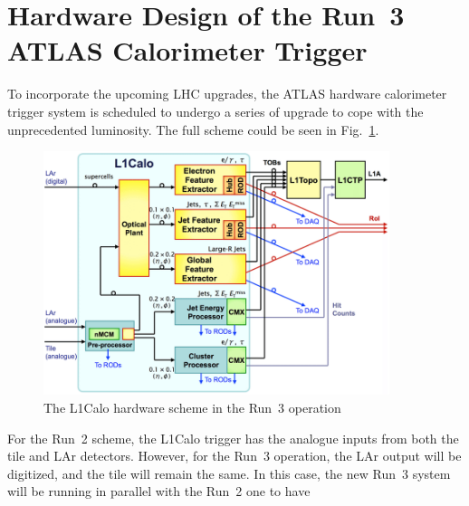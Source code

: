 \section{Hardware Design of the Run~3 ATLAS Calorimeter Trigger}
To incorporate the upcoming LHC upgrades, the ATLAS hardware calorimeter trigger system is scheduled to undergo a series of upgrade to cope with the unprecedented luminosity. The full scheme could be seen in Fig.~\ref{Fig:l1calo_scheme}.
\begin{figure}[!h]                
	\includegraphics[width=0.9\textwidth]{Chapter6/L1Calo.png}
	\begin{center}
		\caption{The L1Calo hardware scheme in the Run~3 operation\cite{Schwienhorst:2016efd}}
		\label{Fig:l1calo_scheme}            
	\end{center}
\end{figure}
\noindent
For the Run~2 scheme, the L1Calo trigger has the analogue inputs from both the tile and LAr detectors. However, for the Run~3 operation, the LAr output will be digitized, and the tile will remain the same. In this case, the new Run~3 system will be running in parallel with the Run~2 one to have 